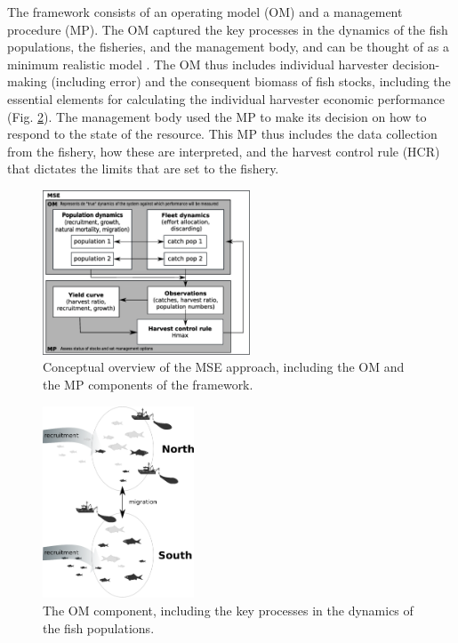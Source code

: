 \documentclass[12pt,oneline,a4paper,numbib]{ouparticle}
\numberwithin{equation}{subsection} %
\begin{document}
The framework consists of an operating model (OM) and a management procedure (MP). The OM captured the key processes in the dynamics of the fish populations, the fisheries, and the management body, and can be thought of as a minimum realistic model \cite{Punt1995}. The OM thus includes individual harvester decision-making (including error) and the consequent biomass of fish stocks, including the essential elements for calculating the individual harvester economic performance (Fig. \ref{fig:stockdyn}). The management body used the MP to make its decision on how to respond to the state of the resource. This MP thus includes the data collection from the fishery, how these are interpreted, and the harvest control rule (HCR) that dictates the limits that are set to the fishery. 

 
\begin{figure}[!h]
\centering
\includegraphics[width=0.55\textwidth]{Figures/MSE.eps} 
\caption{Conceptual overview of the MSE approach, including the OM and the MP components of the framework.}
\label{fig:MSE}
\end{figure}

\begin{figure}[!h]
\centering
\includegraphics[width=0.4\textwidth]{Figures/Areadynamics.eps} 
\caption{The OM component, including the key processes in the dynamics of the fish populations.}
\label{fig:stockdyn}
\end{figure}
\end{document}
